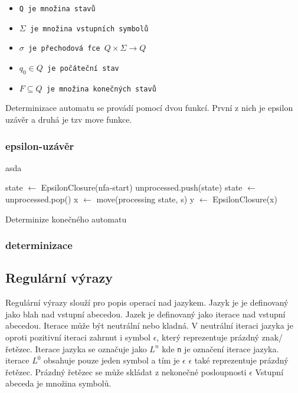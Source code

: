 \begin{itemize}
\item{\tt{Q} je množina stavů}
\item{\tt{$\Sigma$} je množina vstupních symbolů}
\item{\tt{$\sigma$} je přechodová fce $Q \times \Sigma \rightarrow Q$}
\item{\tt{$q_0 \in Q$} je počáteční stav}
\item{\tt{$F \subseteq Q$} je množina konečných stavů}
\end{itemize}
Determinizace automatu se provádí pomocí dvou funkcí.
První z nich je epsilon uzávěr a druhá je tzv move funkce.

\subsubsection{epsilon-uzávěr} %
asda

\begin{algorithm}[H]
	state $\leftarrow$ EpsilonClosure(nfa-start)\;
	unprocessed.push(state)\;
	{
		state $\leftarrow$ unprocessed.pop()\;
		{
			x $\leftarrow$  move(processing state, s)\;
			y $\leftarrow$  EpsilonClosure(x)\;
		}
	}
	\caption{Determinize konečného automatu}
\end{algorithm}

\subsubsection{determinizace} %

\subsection{Regulární výrazy}

Regulární výrazy slouží pro popis operací nad jazykem.
Jazyk je je definovaný jako blah nad vstupní abecedou.
Jazek je definovaný jako iterace nad vstupní abecedou.
Iterace může  být neutrální nebo kladná.
V neutrální iteraci jazyka je oproti pozitivní iteraci zahrnut i symbol $\epsilon$,
který reprezentuje prázdný znak/řetězec.
Iterace jazyka se označuje jako $L^n$ kde \texttt{n} je označení iterace jazyka.
iterace $L^0$ obsahuje pouze jeden symbol a tím je $\epsilon$
$\epsilon$ také reprezentuje prázdný řetězec. Prázdný řetězec se může skládat z nekonečné posloupnosti $\epsilon$
Vstupní abeceda je množina symbolů.

